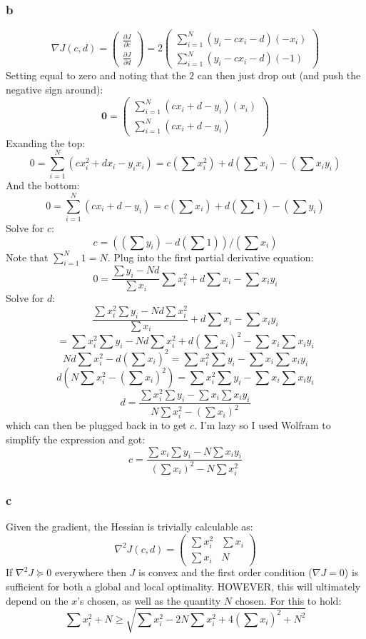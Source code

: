 \documentclass[11pt]{report}
\theoremstyle{definition}
\begin{document}
\subsubsection*{b}
\[
	\nabla J(c, d) = \begin{pmatrix}
		\frac{\partial J}{\partial c} \\
		\frac{\partial J}{\partial d}
	\end{pmatrix}
	=
	2\begin{pmatrix}
		\sum_{i=1}^{N}\left(y_i-cx_i-d\right)(-x_i) \\
		\sum_{i=1}^{N}\left(y_i-cx_i-d\right)(-1)
	\end{pmatrix}
\]
Setting equal to zero and noting that the $2$ can then just drop out (and push the negative sign around):
\[
	\mathbf{0} = \begin{pmatrix}
		\sum_{i=1}^{N}\left(cx_i+d-y_i\right)(x_i) \\
		\sum_{i=1}^{N}\left(cx_i+d-y_i\right)
	\end{pmatrix}
\]
Exanding the top:
\[
	0
	= \sum_{i=1}^N(cx_i^2+dx_i-y_ix_i)
	= c\left(\sum x_i^2\right) + d \left(\sum x_i\right) - \left(\sum x_iy_i\right)
\]
And the bottom:
\[
	0
	= \sum_{i=1}^N(cx_i+d-y_i)
	= c\left(\sum x_i\right) + d\left(\sum 1\right) - \left(\sum y_i\right)
\]
Solve for $c$:
\[
	c = \left(\left(\sum y_i\right)- d\left(\sum 1\right)\right)/ \left(\sum x_i\right)
\]
Note that $\sum_{i=1}^N 1 = N$.
Plug into the first partial derivative equation:
\[ 0=\frac{\sum y_i - Nd}{\sum x_i} \sum x_i^2 + d\sum{x_i}-\sum{x_iy_i} \]
Solve for $d$:
\[ \frac{\sum x_i^2\sum y_i - Nd\sum x_i^2}{\sum x_i} + d\sum x_i - \sum x_iy_i \]
\[=\sum x_i^2\sum y_i - Nd\sum x_i^2 + d\left(\sum x_i\right)^2-\sum x_i\sum x_iy_i\]
\[Nd\sum x_i^2 - d\left(\sum x_i\right)^2 = \sum x_i^2\sum y_i - \sum x_i\sum x_iy_i\]
\[d \left(N\sum x_i^2 - \left(\sum x_i\right)^2\right) = \sum x_i^2\sum y_i - \sum x_i\sum x_iy_i\]
\[ d = \frac{\sum x_i^2\sum y_i - \sum x_i\sum x_iy_i}{N\sum x_i^2 - \left(\sum x_i\right)^2 } \]
which can then be plugged back in to get $c$. I'm lazy so I used Wolfram to
simplify the expression and got:
\[ c = \frac{\sum x_i\sum y_i - N \sum x_iy_i}{\left(\sum x_i\right)^2-N\sum x_i^2} \]

\subsubsection*{c}
Given the gradient, the Hessian is trivially calculable as:
\[
	\nabla^2 J(c,d) = \begin{pmatrix}
		\sum x_i^2 & \sum x_i \\
		\sum x_i   & N
	\end{pmatrix}
\]
If $\nabla^2 J \succcurlyeq 0$ everywhere then $J$ is convex and the first order condition ($\nabla J = 0$)
is sufficient for both a global and local optimality. HOWEVER, this will ultimately depend
on the $x$'s chosen, as well as the quantity $N$ chosen. For this to hold:
\[\sum x_i^2 + N \geq \sqrt{\sum x_i^2 - 2N\sum x_i^2+4\left(\sum x_i\right)^2 + N^2}\]


\end{document}
